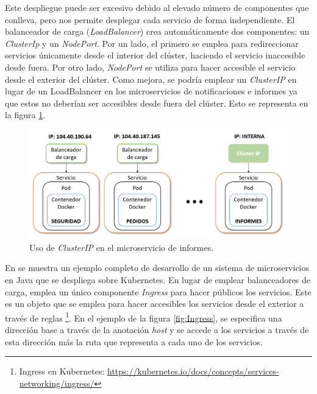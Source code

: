 \documentclass[11pt,spanish,listoffigures]{tfgetsinf}
\begin{document}
Este despliegue puede ser excesivo debido al elevado número de componentes que conlleva, pero nos permite desplegar cada servicio de forma independiente. El balanceador de carga (\textit{LoadBalancer}) crea automáticamente dos componentes: un \textit{ClusterIp} y un \textit{NodePort}. Por un lado, el primero se emplea para redireccionar servicios únicamente desde el interior del clúster, haciendo el servicio inaccesible desde fuera. Por otro lado, \textit{NodePort} se utiliza para hacer accesible el servicio desde el exterior del clúster. Como mejora, se podría emplear un \textit{ClusterIP} en lugar de un LoadBalancer en los microservicios de notificaciones e informes ya que estos no deberían ser accesibles desde fuera del clúster. Esto se representa en la figura \ref{fig:ClusterIP}.

\begin{figure}[h]
\centering
\includegraphics[scale=0.65]{ClusterIP}
\caption{Uso de \textit{ClusterIP} en el microservicio de informes.}
\label{fig:ClusterIP}
\end{figure}

\newpage

En \cite{Minkowski2018} se muestra un ejemplo completo de desarrollo de un sistema de microservicios en Java que se despliega sobre Kubernetes. En lugar de emplear balanceadores de carga, emplea un único componente \textit{Ingress} para hacer públicos los servicios. Este es un objeto que se emplea para hacer accesibles los servicios desde el exterior a través de reglas \footnote{Ingress en Kubernetes: \url{https://kubernetes.io/docs/concepts/services-networking/ingress/}}. En el ejemplo de la figura \ref{fig:Ingress}, se especifica una dirección base a través de la anotación \textit{host} y se accede a los servicios a través de esta dirección más la ruta que representa a cada uno de los servicios.
\end{document}

